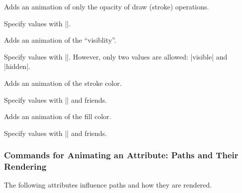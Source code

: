 \begin{command}{\pgfsys@animatestrokeopacity}
  Adds an animation of only the opacity of draw (stroke) operations.
  
  Specify values with |\pgfsys@animation@scalar|.
  
\begin{codeexample}[width=2cm]
\end{codeexample}
\end{command}

\begin{command}{\pgfsys@animatevisibility}
  Adds an animation of the ``visiblity''.
  
  Specify values with |\pgfsys@animation@text|. However, only two values are allowed:
  |visible| and |hidden|.
\begin{codeexample}[width=2cm]
\end{codeexample}
\end{command}

\begin{command}{\pgfsys@animatestrokecolor}
  Adds an animation of the stroke color.

  Specify values with |\pgfsys@animation@color@rgb| and friends.
\begin{codeexample}[width=2cm]
\end{codeexample}
\end{command}

\begin{command}{\pgfsys@animatefillcolor}
  Adds an animation of the fill color.
  
  Specify values with |\pgfsys@animation@color@rgb| and friends.
\begin{codeexample}[width=2cm]
\end{codeexample}
\end{command}


\subsubsection{Commands for Animating an Attribute: Paths and Their Rendering}

The following attributes influence paths and how they are rendered.


